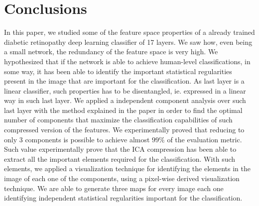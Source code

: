 \documentclass[review]{elsarticle}
\theoremstyle{definition} %
\theoremstyle{remark}
\begin{document}

\section{Conclusions}\label{sec:conclusions}

In this paper, we studied some of the feature space properties of a already trained diabetic retinopathy deep learning classifier of 17 layers. We saw how, even being a small network, the redundancy of the feature space is very high. We hypothesized that if the network is able to achieve human-level classifications, in some way, it has been able to identify the important statistical regularities present in the image that are important for the classification. As last layer is a linear classifier, such properties has to be disentangled, ie. expressed in a linear way in such last layer. We applied a independent component analysis over such last layer with the method explained in the paper in order to find the optimal number of components that maximize the classification capabilities of such compressed version of the features. We experimentally proved that reducing to only 3 components is possible to achieve almost $99\%$ of the evaluation metric. Such value experimentally prove that the ICA compression has been able to extract all the important elements required for the classification. With such elements, we applied a visualization technique for identifying the elements in the image of each one of the components, using a pixel-wise derived visualization technique. We are able to generate three maps for every image each one identifying independent statistical regularities important for the classification.

\end{document}
